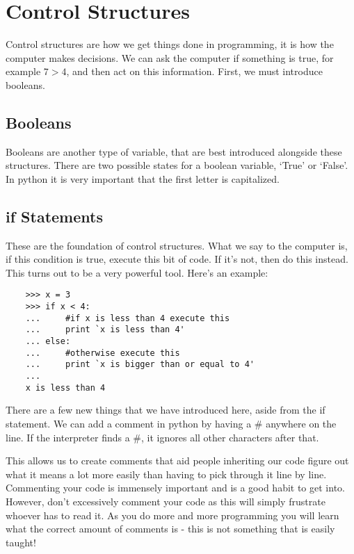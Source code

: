 \section{Control Structures}

Control structures are how we get things done in programming, it is how the
computer makes decisions. We can ask the computer if something is true, for
example $7 > 4$, and then act on this information. First, we must introduce
booleans.

\subsection {Booleans}

Booleans are another type of variable, that are best introduced alongside these
structures. There are two possible states for a boolean variable, `True' or
`False'. In python it is very important that the first letter is capitalized.

\subsection{if Statements}

These are the foundation of control structures. What we say to the computer is,
if this condition is true, execute this bit of code. If it's not, then do this
instead. This turns out to be a very powerful tool. Here's an example:

\begin{lstlisting}
    >>> x = 3
    >>> if x < 4:
    ...     #if x is less than 4 execute this
    ...     print `x is less than 4'
    ... else:
    ...     #otherwise execute this
    ...     print `x is bigger than or equal to 4'
    ...
    x is less than 4
\end{lstlisting}

There are a few new things that we have introduced here, aside from the if
statement. We can add a comment in python by having a \# anywhere on the line.
If the interpreter finds a \#, it ignores all other characters after that.

This allows us to create comments that aid people inheriting our code figure
out what it means a lot more easily than having to pick through it line by line.
Commenting your code is immensely important and is a good habit to get into.
However, don't excessively comment your code as this will simply frustrate
whoever has to read it. As you do more and more programming you will learn what
the correct amount of comments is - this is not something that is easily taught!

